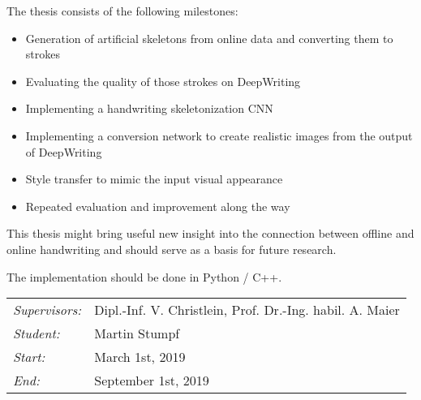 \documentclass[12pt,a4paper]{article}
\begin{document}
The thesis consists of the following milestones:
\begin{itemize}
  	\setlength\itemsep{0em}
	\item Generation of artificial skeletons from online data and converting them to strokes
	\item Evaluating the quality of those strokes on DeepWriting
	\item Implementing a handwriting skeletonization CNN
	\item Implementing a conversion network to create realistic images from the output of DeepWriting
	\item Style transfer to mimic the input visual appearance
	\item Repeated evaluation and improvement along the way
\end{itemize}

This thesis might bring useful new insight into the connection between offline and online handwriting and should serve as a basis for future research.

The implementation should be done in Python / C++.\\
		
\begin{tabular}{ll}
	\emph{Supervisors:} & Dipl.-Inf. V. Christlein, Prof. Dr.-Ing. habil. A. Maier
	\\
	\emph{Student:}     & Martin Stumpf
	\\
	\emph{Start:}       & March 1st, 2019                                            \\
	\emph{End:}         & September 1st, 2019                                        \\
\end{tabular}
\nopagebreak[4]
\small

\printbibliography
		
\end{document}
